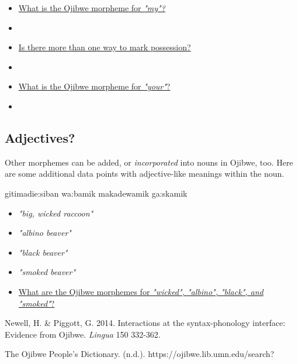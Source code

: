 \documentclass[a4paper,11pt]{article}
\begin{document}
\vspace{1cm}
\begin{itemize}
\item \underline{What is the Ojibwe morpheme for \textit{"my"?}}
\item[] 
\item \underline{Is there more than one way to mark possession?}
\item[] 
\item \underline{What is the Ojibwe morpheme for \textit{"your"}?}
\item[] 
\end{itemize}



\pagebreak
\subsection{Adjectives?}

Other morphemes can be added, or \textit{incorporated} into nouns in Ojibwe, too. Here are some additional data points with adjective-like meanings within the noun.

\vspace{1cm}
\begin{multicols}{2}
\begin{exe}
\ex gitimad{\textyogh}ie:siban 
\ex wa:bamik
\ex makadewamik 
\ex ga:skamik
\end{exe}
\columnbreak
\begin{itemize}
\item[] \textit{"big, wicked raccoon"}
\item[] \textit{"albino beaver"}
\item[] \textit{"black beaver"}
\item[] \textit{"smoked beaver"}
\end{itemize}
\end{multicols}
\vspace{1cm}

\begin{itemize}
\item \underline{What are the Ojibwe morphemes for \textit{"wicked", "albino", "black", and "smoked"}?}
\end{itemize}
\vspace{4cm}

\begin{thebibliography}{20}
\addtolength{\leftmargin}{0.2in} %
\setlength{\itemindent}{-0.2in}

 Newell, H. \& Piggott, G. 2014. Interactions at the syntax-phonology interface: Evidence from Ojibwe. \textit{Lingua} 150 332-362.

 The Ojibwe People’s Dictionary. (n.d.). https://ojibwe.lib.umn.edu/search?


\end{thebibliography}
\end{document}
